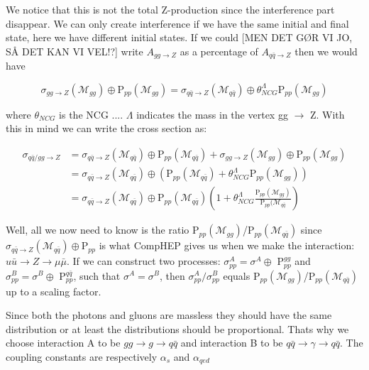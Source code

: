 We notice that this is not the total Z-production since the interference part disappear. We can only create interference if we have the same initial and final state, here we have different initial states. If we could [MEN DET GØR VI JO, SÅ DET KAN VI VEL!?] write $A_{gg \rightarrow Z}$ as a percentage of $A_{q \bar q \rightarrow Z}$ then we would have

\begin{equation}
\sigma_{gg\rightarrow Z} (\mathcal{M}_{gg}) \oplus \textrm{P}_{pp}(\mathcal{M}_{gg})=\sigma_{q \bar q\rightarrow Z}(\mathcal{M}_{q \bar q}) \oplus \theta_{NCG}^{\Lambda}\textrm{P}_{pp}(\mathcal{M}_{gg})
\end{equation}

where $\theta_{NCG}$ is the NCG .... $\Lambda$ indicates the mass in the vertex gg $\rightarrow$ Z. With this in mind we can write the cross section as:

\begin{align}
\sigma_{q \bar q/gg \rightarrow Z} &= \sigma_{q \bar q \rightarrow Z} (\mathcal{M}_{q \bar q}) \oplus \textrm{P}_{pp}(\mathcal{M}_{q \bar q})+ \sigma_{gg\rightarrow Z} (\mathcal{M}_{gg}) \oplus \textrm{P}_{pp}(\mathcal{M}_{gg})\nonumber \\ 
&= \sigma_{q \bar q\rightarrow Z}(\mathcal{M}_{q \bar q}) \oplus (\textrm{P}_{pp}(\mathcal{M}_{q \bar q})+\theta_{NCG}^{\Lambda}\textrm{P}_{pp}(\mathcal{M}_{gg}))\nonumber \\ 
&= \sigma_{q \bar q\rightarrow Z}(\mathcal{M}_{q \bar q}) \oplus \textrm{P}_{pp}(\mathcal{M}_{q \bar q}) \left ( 1+\theta_{NCG}^{\Lambda}\frac{\textrm{P}_{pp}(\mathcal{M}_{gg})}{\textrm{P}_{pp}(\mathcal{M}_{q \bar q}} \right )
\end{align}

Well, all we now need to know is the ratio P$_{pp}(\mathcal{M}_{gg})$/P$_{pp}(\mathcal{M}_{q \bar q})$ since $ \sigma_{q \bar q\rightarrow Z}(\mathcal{M}_{q \bar q}) \oplus \textrm{P}_{pp}$ is what CompHEP gives us when we make the interaction: $u \bar u \rightarrow Z \rightarrow \mu \bar \mu $. If we can construct two processes: $\sigma_{pp}^{A}=\sigma^{A} \oplus$ P$_{pp}^{gg}$ and $\sigma_{pp}^{B}=\sigma^{B} \oplus$ P$_{pp}^{q \bar q}$, such that $\sigma^{A}=\sigma^{B}$, then $\sigma_{pp}^{A}/\sigma_{pp}^{B}$ equals  P$_{pp}(\mathcal{M}_{gg})$/P$_{pp}(\mathcal{M}_{q \bar q})$ up to a scaling factor.

Since both the photons and gluons are massless they should have the same distribution or at least the distributions should be proportional. Thats why we choose interaction A to be $gg \rightarrow g \rightarrow q \bar q$ and interaction B to be $q \bar q \rightarrow \gamma \rightarrow q \bar q$. The coupling constants are respectively $\alpha_{s}$ and $\alpha_{qed}$\\

